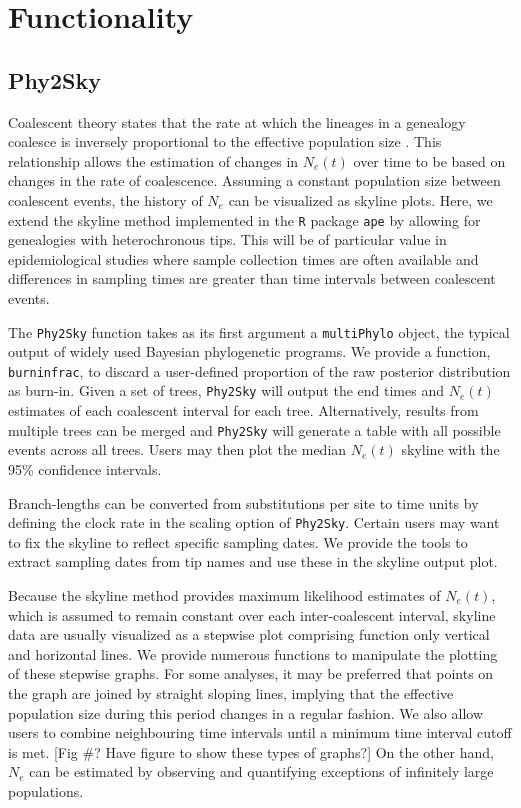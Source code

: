 \documentclass[english,titlepage]{article}
\begin{document}
\section*{Functionality}
\subsection*{Phy2Sky}

Coalescent theory states that the rate at which the lineages in a genealogy coalesce is inversely proportional to the effective population size \citep{Kingman1982} \citep{slatkin_pairwise_1991}. This relationship allows the estimation of changes in $N_e(t)$ over time to be based on changes in the rate of coalescence. Assuming a constant population size between coalescent events, the history of $N_e$ can be visualized as skyline plots. Here, we extend the skyline method implemented in the \texttt{R} package \texttt{ape} \citep{Paradis2004} by allowing for genealogies with heterochronous tips. This will be of particular value in epidemiological studies where sample collection times are often available and differences in sampling times are greater than time intervals between coalescent events. 


The \texttt{Phy2Sky} function takes as its first argument a \texttt{multiPhylo} object, the typical output of widely used Bayesian phylogenetic programs. We provide a function, \texttt{burninfrac}, to discard a user-defined proportion of the raw posterior distribution as burn-in. Given a set of trees, \texttt{Phy2Sky} will output the end times and $N_e(t)$ estimates of each coalescent interval for each tree. Alternatively, results from multiple trees can be merged and \texttt{Phy2Sky} will generate a table with all possible events across all trees. Users may then plot the median $N_e(t)$ skyline with the 95\% confidence intervals.

Branch-lengths can be converted from substitutions per site to time units by defining the clock rate in the scaling option of \texttt{Phy2Sky}. Certain users may want to fix the skyline to reflect specific sampling dates. We provide the tools to extract sampling dates from tip names and use these in the skyline output plot.

Because the skyline method provides maximum likelihood estimates of $N_e(t)$, which is assumed to remain constant over each inter-coalescent interval, skyline data are usually visualized as a stepwise plot comprising function only vertical and horizontal lines. We provide numerous functions to manipulate the plotting of these stepwise graphs. For some analyses, it may be preferred that points on the graph are joined by straight sloping lines, implying that the effective population size during this period changes in a regular fashion. We also allow users to combine neighbouring time intervals until a minimum time interval cutoff is met. [Fig \#? Have figure to show these types of graphs?] On the other hand, $N_e$ can be estimated by observing and quantifying exceptions of infinitely large populations. 
\end{document}
